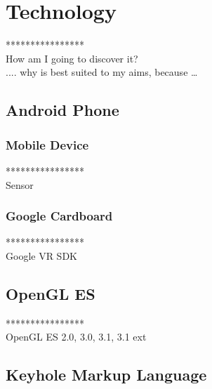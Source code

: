\label{chapter-technology}
\chapter{Technology}

****************\\
How am I going to discover it?\\
.... why is best suited to my aims, because …\\

\section{Android Phone}

\subsection{Mobile Device}

****************\\
Sensor\\

\subsection{Google Cardboard}

****************\\
Google VR SDK\\

\section{OpenGL ES}

****************\\
OpenGL ES 2.0, 3.0,  3.1, 3.1 ext\\

\section{Keyhole Markup Language}

